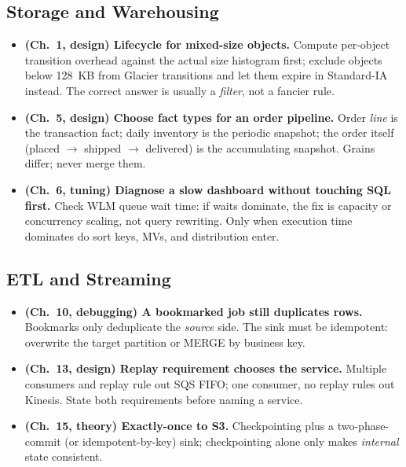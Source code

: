\subsection{Storage and Warehousing}
\begin{itemize}
    \item \textbf{(Ch.~1, design) Lifecycle for mixed-size objects.} Compute per-object
    transition overhead against the actual size histogram first; exclude objects below 128~KB
    from Glacier transitions and let them expire in Standard-IA instead. The correct answer is
    usually a \emph{filter}, not a fancier rule.
    \item \textbf{(Ch.~5, design) Choose fact types for an order pipeline.} Order \emph{line} is
    the transaction fact; daily inventory is the periodic snapshot; the order itself
    (placed $\rightarrow$ shipped $\rightarrow$ delivered) is the accumulating snapshot. Grains
    differ; never merge them.
    \item \textbf{(Ch.~6, tuning) Diagnose a slow dashboard without touching SQL first.} Check
    WLM queue wait time: if waits dominate, the fix is capacity or concurrency scaling, not
    query rewriting. Only when execution time dominates do sort keys, MVs, and distribution
    enter.
\end{itemize}
\subsection{ETL and Streaming}
\begin{itemize}
    \item \textbf{(Ch.~10, debugging) A bookmarked job still duplicates rows.} Bookmarks only
    deduplicate the \emph{source} side. The sink must be idempotent: overwrite the target
    partition or MERGE by business key.
    \item \textbf{(Ch.~13, design) Replay requirement chooses the service.} Multiple consumers
    and replay rule out SQS FIFO; one consumer, no replay rules out Kinesis. State both
    requirements before naming a service.
    \item \textbf{(Ch.~15, theory) Exactly-once to S3.} Checkpointing plus a two-phase-commit
    (or idempotent-by-key) sink; checkpointing alone only makes \emph{internal} state
    consistent.
\end{itemize}
